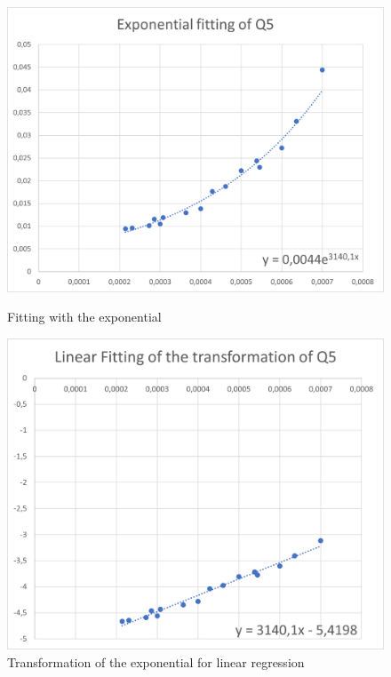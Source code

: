 \documentclass{article}
\begin{document}
                    \begin{figure}[htbp!]
                        \centering
                        \begin{minipage}[c]{.40\textwidth}
                            \centering
                            \includegraphics[width=\textwidth]{./data_analysis/Q5_exp_lambda_mu.png}
                            \caption{Fitting with the exponential}
                            \label{fig:Q5_exp_lambda_mu}
                        \end{minipage}
                        \hspace{10mm}
                        \begin{minipage}[c]{.40\textwidth}
                            \centering
                            \includegraphics[width=\textwidth]{./data_analysis/Q5_lin_lambda_mu.png}
                            \caption{Transformation of the exponential for linear regression}
                            \label{fig:Q5_lin_lambda_mu}
                        \end{minipage}
                    \end{figure} 
                    
\end{document}
